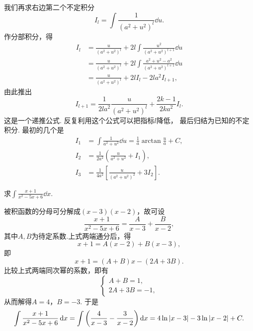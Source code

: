 我们再求右边第二个不定积分\[
	I_l = \int \frac{1}{(a^2+u^2)^l} \dd{u}.
\]
作分部积分，得\begin{align*}
	I_l &= \frac{u}{(a^2+u^2)^l} + 2l \int \frac{u^2}{(a^2+u^2)^{l+1}} \dd{u} \\
	&= \frac{u}{(a^2+u^2)^l} + 2l \int \frac{a^2+u^2-a^2}{(a^2+u^2)^{l+1}} \dd{u} \\
	&= \frac{u}{(a^2+u^2)^l} + 2l I_l - 2la^2 I_{l+1},
\end{align*}
由此推出\[
	I_{l+1} = \frac{1}{2la^2} \frac{u}{(a^2+u^2)^l} + \frac{2k-1}{2ka^2} I_l.
\]
这是一个递推公式.
反复利用这个公式可以把指标\(l\)降低，
最后归结为已知的不定积分.
最初的几个是\begin{align*}
	I_1 &= \int \frac{1}{a^2+u^2} \dd{u} = \frac{1}{a} \arctan\frac{u}{a} + C, \\
	I_2 &= \frac{1}{2a^2} \left( \frac{u}{a^2+u^2} + I_1 \right), \\
	I_3 &= \frac{1}{4a^2} \left[ \frac{u}{(a^2+u^2)^2} + 3 I_2 \right].
\end{align*}

\begin{example}
求\(\int \frac{x+1}{x^2-5x+6} \dd{x}\).
\begin{solution}
被积函数的分母可分解成\((x-3)(x-2)\)，故可设\[
	\frac{x+1}{x^2-5x+6}
	= \frac{A}{x-3} + \frac{B}{x-2},
\]
其中\(A,B\)为待定系数.上式两端通分后，得\[
	x+1 = A(x-2)+B(x-3),
\]
即\[
	x+1 = (A+B)x -(2A+3B).
\]
比较上式两端同次幂的系数，即有\[
	\left\{ \begin{array}{l}
		A+B = 1, \\
		2A+3B = -1,
	\end{array} \right.
\]
从而解得\(A=4\)，\(B=-3\).
于是\[
	\int \frac{x+1}{x^2-5x+6} \dd{x}
	= \int \left(\frac{4}{x-3} - \frac{3}{x-2}\right) \dd{x}
	= 4\ln\abs{x-3} - 3\ln\abs{x-2} + C.
\]
\end{solution}
\end{example}
